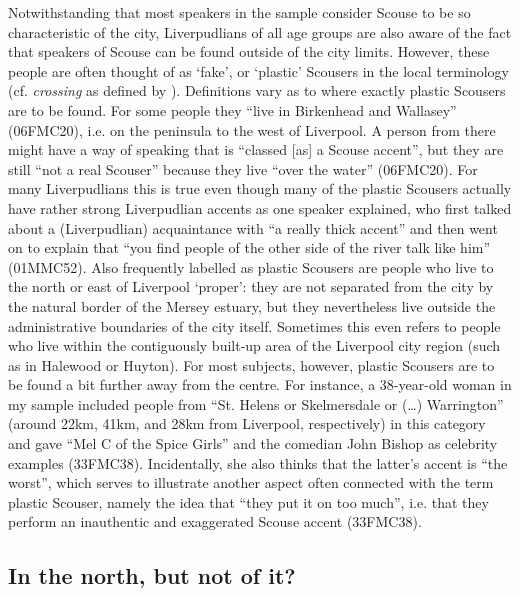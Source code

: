 Notwithstanding that most speakers in the sample consider Scouse to be so characteristic of the city, Liverpudlians of all age groups are also aware  of the fact that speakers of Scouse can be found outside of the city limits.
However, these people are often thought of as `fake', or `plastic' Scousers in the local terminology (cf. \emph{crossing} as defined by \citealt{rampton1995}).
Definitions vary as to where exactly plastic Scousers are to be found.
For some people they ``live in Birkenhead and Wallasey'' (06FMC20), i.e. on the  peninsula to the west of Liverpool.
A person from there might have a way of speaking that is ``classed [as] a Scouse accent'', but they are still ``not a real Scouser'' because they live ``over the water'' (06FMC20).
For many Liverpudlians this is true even though many of the plastic Scousers actually have rather strong Liverpudlian accents as one speaker explained, who first talked about a (Liverpudlian) acquaintance with ``a really thick accent'' and then went on to explain that ``you find people of the other side of the river talk like him'' (01MMC52).
Also frequently labelled as plastic Scousers are people who live to the north or east of Liverpool `proper': they are not separated from the city by the natural border of the Mersey estuary, but they nevertheless live outside the administrative boundaries of the city itself.
Sometimes this even refers to people who live within the contiguously built-up area of the Liverpool city region (such as in Halewood or Huyton).
For most subjects, however, plastic Scousers are to be found a bit further away from the centre.
For instance, a 38-year-old woman in my sample included people from ``St. Helens or Skelmersdale or (\ldots) Warrington'' (around 22km, 41km, and 28km from Liverpool, respectively) in this category and gave ``Mel C of the Spice Girls'' and the comedian John Bishop as celebrity examples (33FMC38).
Incidentally, she also thinks that the latter's accent is ``the worst'', which serves to illustrate another aspect often connected with the term plastic Scouser, namely the idea that ``they put it on too much'', i.e. that they perform an inauthentic and exaggerated Scouse accent (33FMC38).

\subsection{In the north, but not of it?}
\label{aware_res.north}

